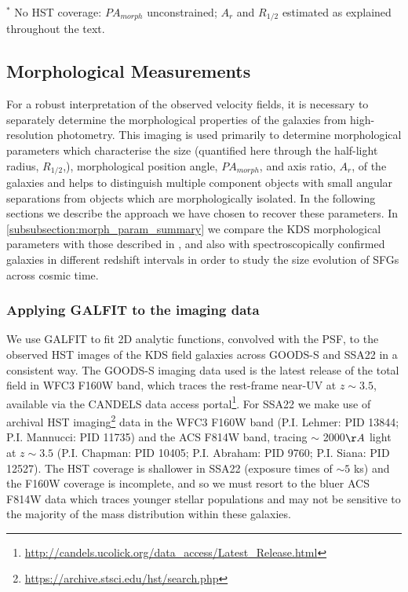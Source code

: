 \documentclass[fleqn,usenatbib]{mn2e}
\begin{document}
\begin{table*}
\begin{threeparttable}
\begin{tabular}{ccccccccccc}
\end{tabular}
\begin{tablenotes}
      \small
      \item $^{*}$ No HST coverage: $PA_{morph}$ unconstrained; $A_{r}$ and $R_{1/2}$ estimated as explained throughout the text.
    \end{tablenotes}
  \end{threeparttable}
  \end{table*}


\subsection{Morphological Measurements}
For a robust interpretation of the observed velocity fields, it is necessary to separately determine the morphological properties of the galaxies from high-resolution photometry.
This imaging is used primarily to determine morphological parameters which characterise the size (quantified here through the half-light radius, $R_{1/2}$,), morphological position angle, $PA_{morph}$, and axis ratio, $A_{r}$, of the galaxies and helps to distinguish multiple component objects with small angular separations from objects which are morphologically isolated.
In the following sections we describe the approach we have chosen to recover these parameters.
In \cref{subsubsection:morph_param_summary} we compare the KDS morphological parameters with those described in \cite{VanderWel2012}, and also with spectroscopically confirmed galaxies in different redshift intervals in order to study the size evolution of SFGs across cosmic time.

\subsubsection{Applying GALFIT to the imaging data}\label{subsubsec:galfitting}
We use GALFIT \citep{Peng2010_galfit} to fit 2D analytic functions, convolved with the PSF, to the observed HST images of the KDS field galaxies across GOODS-S and SSA22 in a consistent way.
The GOODS-S imaging data used is the latest release of the total field in WFC3 F160W band, which traces the rest-frame near-UV at $z \sim 3.5$, available via the CANDELS \citep{Grogin2011,Koekemoer2011} data access portal\footnote{\tiny{\url{http://candels.ucolick.org/data_access/Latest_Release.html}}}.
For SSA22 we make use of archival HST imaging\footnote{\tiny{\url{https://archive.stsci.edu/hst/search.php}}} data in the WFC3 F160W band (P.I. Lehmer: PID 13844; P.I. Mannucci: PID 11735) and the ACS F814W band, tracing $\sim$ 2000$\AA$ light at $z\sim 3.5$ (P.I. Chapman: PID 10405; P.I. Abraham: PID 9760; P.I. Siana: PID 12527).
The HST coverage is shallower in SSA22 (exposure times of $\sim 5$ ks) and the F160W coverage is incomplete, and so we must resort to the bluer ACS F814W data which traces younger stellar populations and may not be sensitive to the majority of the mass distribution within these galaxies.
\end{document}
